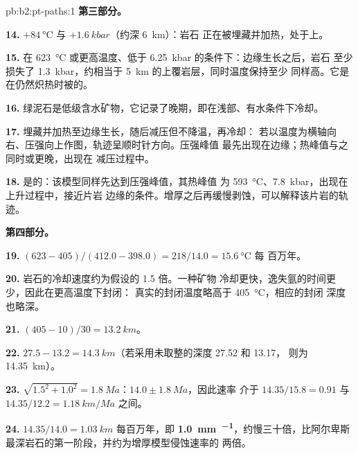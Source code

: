 \begin{solution}{pb:b2:pt-paths:1}
\noindent\textbf{第三部分。}

\textbf{14.} $+\qty{84}{\celsius}$ 与 $+\qty{1.6}{kbar}$（约深 \qty{6}{km}）：岩石
正在被埋藏并加热，处于上。

\textbf{15.} 在 \qty{623}{\celsius} 或更高温度、低于 \qty{6.25}{kbar} 的条件下：边缘生长之后，岩石
至少损失了 \qty{1.3}{kbar}，约相当于 \qty{5}{km} 的上覆岩层，同时温度保持至少
同样高。它是在仍然炽热时被的。

\textbf{16.} 绿泥石是低级含水矿物，它记录了晚期，即在浅部、有水条件下冷却。

\textbf{17.} 埋藏并加热至边缘生长，随后减压但不降温，再冷却：
若以温度为横轴向右、压强向上作图，轨迹呈顺时针方向。压强峰值
最先出现在边缘；热峰值与之同时或更晚，出现在
减压过程中。

\textbf{18.} 是的：该模型同样先达到压强峰值，其热峰值
为 \qty{593}{\celsius}、\qty{7.8}{kbar}，出现在上升过程中，接近片岩
边缘的条件。增厚之后再缓慢剥蚀，可以解释该片岩的轨迹。

\noindent\textbf{第四部分。}

\textbf{19.} $(623 - 405)/(412.0 - 398.0) = 218/14.0 = \qty{15.6}{\celsius}$ 每
百万年。

\textbf{20.} 岩石的冷却速度约为假设的 1.5 倍。一种矿物
冷却更快，逸失氩的时间更少，因此在更高温度下封闭：
真实的封闭温度略高于 \qty{405}{\celsius}，相应的封闭
深度也略深。

\textbf{21.} $(405 - 10)/30 = \qty{13.2}{km}$。

\textbf{22.} $27.5 - 13.2 = \qty{14.3}{km}$（若采用未取整的深度 27.52 和 13.17，
则为 \qty{14.35}{km}）。

\textbf{23.} $\sqrt{1.5^2 + 1.0^2} = \qty{1.8}{Ma}$：$14.0 \pm \qty{1.8}{Ma}$，因此速率
介于 $14.35/15.8 = 0.91$ 与 $14.35/12.2 = \qty{1.18}{km/Ma}$ 之间。

\textbf{24.} $14.35/14.0 = \qty{1.03}{km}$ 每百万年，即
\textbf{\qty[text-series-to-math=true]{1.0}{mm.^{-1}}}，约慢三十倍，比阿尔卑斯
最深岩石的第一阶段，并约为增厚模型侵蚀速率的
两倍。
\end{solution}
